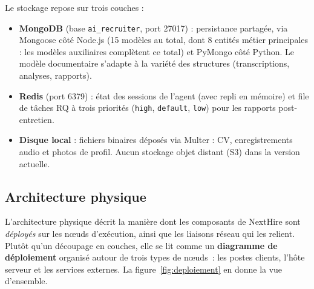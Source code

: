 Le stockage repose sur trois couches :

\begin{itemize}
  \item \textbf{MongoDB} (base \texttt{ai\_recruiter}, port 27017) : persistance partagée,
        via Mongoose côté Node.js (15 modèles au total, dont 8 entités métier principales : les modèles auxiliaires complètent ce total) et PyMongo côté Python. Le modèle documentaire
        s'adapte à la variété des structures (transcriptions, analyses, rapports).
  \item \textbf{Redis} (port 6379) : état des sessions de l'agent (avec repli en mémoire) et
        file de tâches RQ à trois priorités (\texttt{high}, \texttt{default}, \texttt{low})
        pour les rapports post-entretien.
  \item \textbf{Disque local} : fichiers binaires déposés via Multer : CV, enregistrements
        audio et photos de profil. Aucun stockage objet distant (S3) dans la version actuelle.
\end{itemize}

\subsection{Architecture physique}

L'architecture physique décrit la manière dont les composants de NextHire sont \emph{déployés} sur les nœuds d'exécution, ainsi que les liaisons réseau qui les relient. Plutôt qu'un découpage en couches, elle se lit comme un \textbf{diagramme de déploiement} organisé autour de trois types de nœuds~: les postes clients, l'hôte serveur et les services externes. La figure~\ref{fig:deploiement} en donne la vue d'ensemble.

